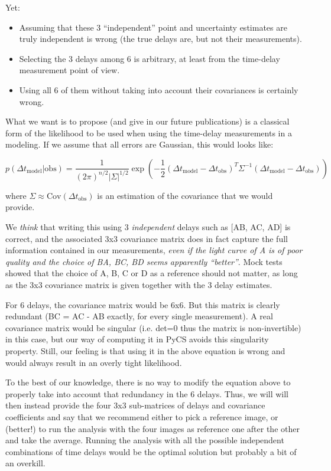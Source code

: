 \documentclass[11pt]{scrartcl}
\newcommand{\dt}[1]{\ensuremath{\Delta t_{\mathrm{#1}}}\xspace}
\begin{document}
Yet:

\begin{itemize}
\item Assuming that these 3 ``independent'' point and uncertainty 
estimates are truly independent is wrong (the true delays are, but not 
their measurements). 
\item Selecting the 3 delays among 6 is arbitrary, at least from the 
time-delay measurement point of view.
\item Using all 6 of them without taking into account their covariances 
is certainly wrong.
\end{itemize}


What we want is to propose (and give in our future publications) is a 
classical form of the likelihood to be used when using the time-delay 
measurements in a modeling. If we assume that all errors are Gaussian, 
this would looks like:

\begin{equation}
p(\dt{model} | \mathrm{obs}) = \frac{1}{(2 \pi)^{n/2} 
|\Sigma|^{1/2}}\exp\left( -\frac{1}{2} 
(\dt{model}-\dt{obs})^T\Sigma^{-1}(\dt{model}-\dt{obs}) \right)
\end{equation}

where $\Sigma \approx \textrm{Cov}(\dt{obs})$ is an estimation of the 
covariance that we would provide.



We \emph{think} that writing this using 3 \emph{independent} 
delays such as [AB, AC, 
AD] is correct, and the associated 3x3 covariance matrix does in fact 
capture the full information contained in our measurements, \emph{even 
if the light curve of A is of poor quality and the choice of BA, BC, BD 
seems apparently ``better''}. Mock tests showed that the choice of A, 
B, C or D as 
a reference should not 
matter, as long as the 3x3 covariance matrix is given together with the 
3 delay estimates.

For 6 delays, the covariance matrix would be 6x6. But this matrix 
is clearly redundant (BC = AC - AB exactly, for every single 
measurement). A real covariance matrix would be singular (i.e. det=0 
thus the matrix is non-invertible) in this case, but our way of 
computing it in PyCS avoids this singularity property. Still, our 
feeling is 
that using it in the above equation is wrong and would always result in 
an 
overly 
tight likelihood.

To the best of our knowledge, there is no way to modify the equation 
above to properly take into account that redundancy in the 6 delays. 
Thus, we 
will will then instead provide the four 3x3 sub-matrices of delays and 
covariance coefficients and 
say that we recommend 
either to pick a reference image, or (better!) to run the analysis with 
the four images as reference one after the other and take the average. 
Running the analysis with all the possible 
independent combinations of time delays would be the optimal solution 
but probably a bit of an overkill.
\end{document}
